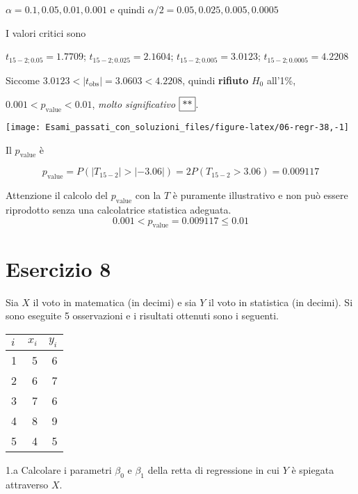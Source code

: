 \documentclass[
  11pt,
]{book}
\theoremstyle{mytheoremstyle}
\theoremstyle{mydefstyle}
\newenvironment{sol}
  {
  \begin{tcolorbox}[enhanced,breakable,arc=0.1mm,boxrule=1pt,colback=white,colframe=iblue,
  title=\bf \fontfamily{lmss}\selectfont \hspace{.5 cm} Soluzione,drop fuzzy shadow]

}{
\end{tcolorbox}
  }
\begin{document}
\begin{sol}
\(\alpha=0.1, 0.05, 0.01, 0.001\) e quindi \(\alpha/2=0.05, 0.025, 0.005, 0.0005\)

I valori critici sono

\(t_{15-2;0.05}=1.7709\); \(t_{15-2;0.025}=2.1604\); \(t_{15-2;0.005}=3.0123\); \(t_{15-2;0.0005}=4.2208\)

Siccome \(3.0123<|t_\text{obs}|=3.0603<4.2208\), quindi \textbf{rifiuto} \(H_0\) all'1\%,

\(0.001<p_\text{value}<0.01\), \emph{molto significativo} \(\fbox{**}\).

\begin{center}\texttt{[image: Esami\_passati\_con\_soluzioni\_files/figure-latex/06-regr-38,-1]} \end{center}

Il \(p_{\text{value}}\) è

\[ p_{\text{value}} = P(|T_{15-2}|>|-3.06|)=2P(T_{15-2}>3.06)=0.009117 \]

Attenzione il calcolo del \(p_\text{value}\) con la \(T\) è puramente illustrativo e non può essere riprodotto senza una calcolatrice statistica adeguata.\[
 0.001 < p_\text{value}= 0.009117 \leq 0.01 
\]

\end{sol}

\section{Esercizio 8}\label{esercizio-8}

Sia \(X\) il voto in matematica (in decimi) e sia \(Y\) il voto in
statistica (in decimi).
Si sono eseguite 5 osservazioni e i risultati ottenuti sono i seguenti.

\begin{table}[H]
\centering
\begin{tabular}{lrr}
\toprule
$i$ & $x_i$ & $y_i$\\
\midrule
1 & 5 & 6\\
2 & 6 & 7\\
3 & 7 & 6\\
4 & 8 & 9\\
5 & 4 & 5\\
\bottomrule
\end{tabular}
\end{table}

1.a Calcolare i parametri \(\beta_{0}\) e \(\beta_{1}\) della retta
di regressione in cui \(Y\) è spiegata attraverso \(X\).
\end{document}
